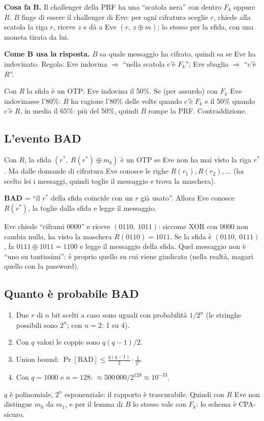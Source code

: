 \textbf{Cosa fa B.} Il challenger della PRF ha una ``scatola nera'' con dentro \(F_k\) oppure \(R\). \(B\) finge di essere il challenger di Eve: per ogni cifratura sceglie \(r\), chiede alla scatola la riga \(r\), riceve \(z\) e dà a Eve \((r,\ z \oplus m)\); lo stesso per la sfida, con una moneta tirata da lui.

\textbf{Come B usa la risposta.} \(B\) sa quale messaggio ha cifrato, quindi sa se Eve ha indovinato. Regola: Eve indovina \(\Rightarrow\) ``nella scatola c'è \(F_k\)''; Eve sbaglia \(\Rightarrow\) ``c'è \(R\)''.

\begin{esempio}
Con \(R\) la sfida è un OTP: Eve indovina il 50\%. Se (per assurdo) con \(F_k\) Eve indovinasse l'80\%: \(B\) ha ragione l'80\% delle volte quando c'è \(F_k\) e il 50\% quando c'è \(R\), in media il 65\%: più del 50\%, quindi \(B\) rompe la PRF. Contraddizione.
\end{esempio}

\subsection{L'evento BAD}

Con \(R\), la sfida \((r^*,\ R(r^*) \oplus m_b)\) è un OTP se Eve non ha mai visto la riga \(r^*\). Ma dalle domande di cifratura Eve conosce le righe \(R(r_1), R(r_2), \dots\) (ha scelto lei i messaggi, quindi toglie il messaggio e trova la maschera).

\textbf{BAD} = ``il \(r^*\) della sfida coincide con un \(r\) già usato''. Allora Eve conosce \(R(r^*)\), la toglie dalla sfida e legge il messaggio.

\begin{esempio}
Eve chiede ``ciframi 0000'' e riceve \((0110,\ 1011)\): siccome XOR con 0000 non cambia nulla, ha visto la maschera \(R(0110) = 1011\). Se la sfida è \((0110,\ 0111)\), fa \(0111 \oplus 1011 = 1100\) e legge il messaggio della sfida. Quel messaggio non è ``uno su tantissimi'': è proprio quello su cui viene giudicata (nella realtà, magari quello con la password).
\end{esempio}

\subsection{Quanto è probabile BAD}

\begin{enumerate}
  \item Due \(r\) di \(n\) bit scelti a caso sono uguali con probabilità \(1/2^n\) (le stringhe possibili sono \(2^n\); con \(n = 2\): 1 su 4).
  \item Con \(q\) valori le coppie sono \(q(q-1)/2\).
  \item Union bound: \(\Pr[\text{BAD}] \le \frac{q(q-1)}{2} \cdot \frac{1}{2^n}\).
  \item Con \(q = 1000\) e \(n = 128\): \(\approx 500\,000 / 2^{128} \approx 10^{-33}\).
\end{enumerate}
\(q\) è polinomiale, \(2^n\) esponenziale: il rapporto è trascurabile. Quindi con \(R\) Eve non distingue \(m_0\) da \(m_1\), e per il lemma di \(B\) lo stesso vale con \(F_k\): lo schema è CPA-sicuro.

